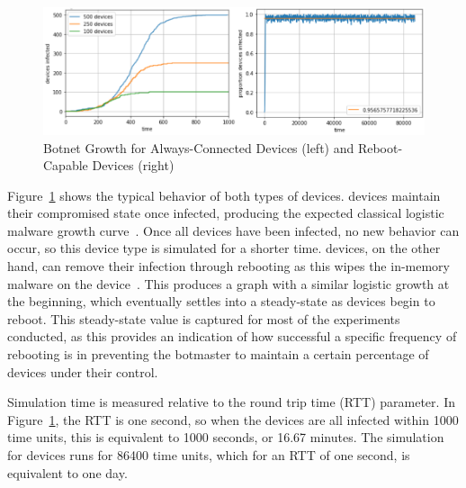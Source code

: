 \begin{figure}[H]
    \centering
    \includegraphics[width=\linewidth]{Figures/Compare_Device_Types.PNG}
    \caption{Botnet Growth for Always-Connected Devices (left) and Reboot-Capable Devices (right)}
    \label{fig:compare_device_types}
\end{figure}
\par

Figure~\ref{fig:compare_device_types} shows the typical behavior of both types of devices. \AC devices maintain their compromised state once infected, producing the expected classical logistic malware growth curve~\cite{stallings_brown_2015}. Once all devices have been infected, no new behavior can occur, so this device type is simulated for a shorter time. \RC devices, on the other hand, can remove their infection through rebooting as this wipes the in-memory malware on the device~\cite{Antonakakis2017_USENIX_Mirai_First_Study}. This produces a graph with a similar logistic growth at the beginning, which eventually settles into a steady-state as devices begin to reboot. This steady-state value is captured for most of the experiments conducted, as this provides an indication of how successful a specific frequency of rebooting is in preventing the botmaster to maintain a certain percentage of devices under their control.
\par
Simulation time is measured relative to the round trip time (RTT) parameter. In Figure~\ref{fig:compare_device_types}, the RTT is one second, so when the \AC devices are all infected within 1000 time units, this is equivalent to 1000 seconds, or 16.67 minutes. The simulation for \RC devices runs for 86400 time units, which for an RTT of one second, is equivalent to one day.

